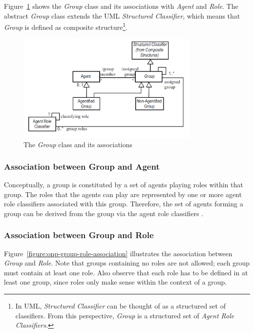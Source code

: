 Figure~\ref{figure:onp-group} shows the \textit{Group} class and its associations with \textit{Agent} and \textit{Role}.
The abstract \textit{Group} class extends the UML \textit{Structured Classifier}, which means that \textit{Group} is defined as composite structure\footnote{In UML, \textit{Structured Classifier} can be thought of as a structured set of classifiers. From this perspective, \textit{Group} is a structured set of \textit{Agent Role Classifiers}.}.

\begin{figure}[ht]
	\centering
	\includegraphics[width=0.8\textwidth]{images/onp/group.png}
	\caption{The \textit{Group} class and its associations \cite{Odell05}}
	\label{figure:onp-group}
\end{figure}

\subsubsection*{Association between Group and Agent}

Conceptually, a group is constituted by a set of agents playing roles within that group.
The roles that the agents can play are represented by one or more agent role classifiers associated with this group.
Therefore, the set of agents forming a group can be derived from the group via the agent role classifiers \cite{Odell05}.

\subsubsection*{Association between Group and Role}

Figure~\ref{figure:onp-group-role-association} illustrates the association between \textit{Group} and \textit{Role}.
Note that groups containing no roles are not allowed; each group must contain at least one role.
Also observe that each role has to be defined in at least one group, since roles only make sense within the context of a group.

